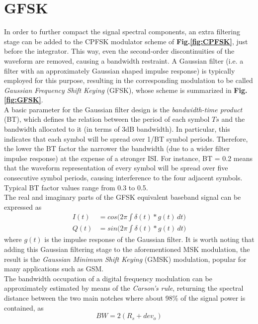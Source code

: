 \documentclass[twoside,twocolumn]{article}
\begin{document}
\section{GFSK}
In order to further compact the signal spectral components, an extra filtering stage can be added to the CPFSK modulator scheme of \textbf{Fig.\ref{fig:CPFSK}}, just before the integrator. This way, even the second-order discontinuities of the waveform are removed, causing a bandwidth restraint. A Gaussian filter (i.e. a filter with an approximately Gaussian shaped impulse response) is typically employed for this purpose, resulting in the corresponding modulation to be called \textit{Gaussian Frequency Shift Keying} (GFSK), whose scheme is summarized in \textbf{Fig.\ref{fig:GFSK}}.\\
A basic parameter for the Gaussian filter design is the \textit{bandwidth-time product} (BT), which defines the relation between the period of each symbol $Ts$ and the bandwidth allocated to it (in terms of 3dB bandwidth). In particular, this indicates that each symbol will be spread over 1/BT symbol periods. Therefore, the lower the BT factor the narrower the bandwidth (due to a wider filter impulse response) at the expense of a stronger ISI. For instance, BT = 0.2 means that the waveform representation of every symbol will be spread over five consecutive symbol periods, causing interference to the four adjacent symbols. Typical BT factor values range from 0.3 to 0.5.\\
The real and imaginary parts of the GFSK equivalent baseband signal can be expressed as
\begin{align}
I(t) &= cos\Big(2\pi \! \int \! \delta(t) \! \ast \! g(t) \, dt\Big) \nonumber \\
Q(t) &= sin\Big(2\pi \! \int \! \delta(t) \! \ast \! g(t) \, dt\Big) \nonumber
\end{align}
where $g(t)$ is the impulse response of the Gaussian filter. It is worth noting that adding this Gaussian filtering stage to the aforementioned MSK modulation, the result is the \textit{Gaussian Minimum Shift Keying} (GMSK) modulation, popular for many applications such as GSM.\\
The bandwidth occupation of a digital frequency modulation can be approximately estimated by means of the \textit{Carson's rule}, returning the spectral distance between the two main notches where about 98\% of the signal power is contained, as
\begin{equation} \label{eq:Carson}
\mathit{BW} = 2(R_{s} + dev_o)
\end{equation}
\end{document}
